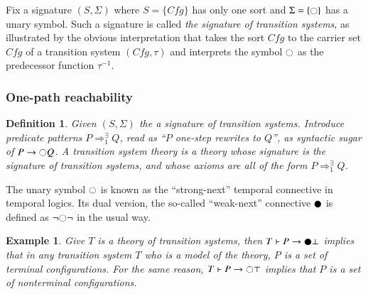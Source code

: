 \documentclass{article}
\theoremstyle{plain}
\newtheorem{defn}[thm]{Definition}
\newtheorem{eg}[thm]{Example}
\def\snext{\fullmoon}
\def\wnext{\newmoon}
\def\Cfg{\textit{Cfg}}
\begin{document}
Fix a signature $(S,\Sigma)$ where $S = \{\Cfg\}$ has only one sort and $\Sigma = \{\snext\}$ has a unary symbol. Such a signature is called \emph{the signature of transition systems}, as illustrated by the obvious interpretation that takes the sort $\Cfg$ to the carrier set $\Cfg$ of a transition system $(\Cfg, \tau)$ and interprets the symbol $\snext$ as the predecessor function $\tau^{-1}$.

\subsubsection{One-path reachability}

\begin{defn}
  Given $(S, \Sigma)$ the a signature of transition systems. Introduce predicate patterns $P \Rightarrow^\exists_1 Q$, read as ``$P$ one-step rewrites to $Q$'', as syntactic sugar of $P \to \snext Q$. A transition system theory is a theory whose signature is the signature of transition systems, and whose axioms are all of the form $P \Rightarrow^\exists_1 Q$.
\end{defn}

The unary symbol $\snext$ is known as the ``strong-next'' temporal connective in temporal logics. Its dual version, the so-called ``weak-next'' connective $\wnext$ is defined as $\neg \snext \neg$ in the usual way.

\begin{eg}
	Give $T$ is a theory of transition systems, then $T \vdash P \to \wnext \bot$ implies that in any transition system $T$ who is a model of the theory, $P$ is a set of terminal configurations. For the same reason, $T \vdash P \to \snext \top$ implies that $P$ is a set of nonterminal configurations.
\end{eg}
\end{document}
